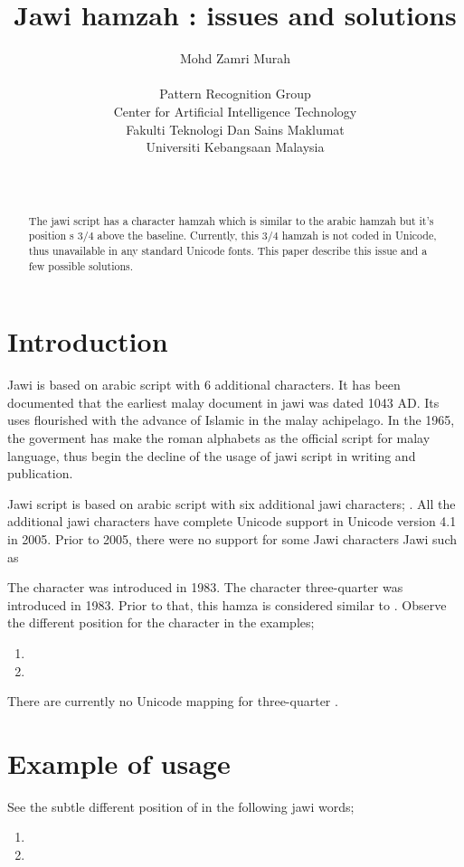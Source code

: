 \documentclass[12pt,a4paper]{IEEEconf}
\author{Mohd Zamri Murah\\
\begin{affiliation}Pattern Recognition Group\\
Center for Artificial Intelligence Technology\\
Fakulti Teknologi Dan Sains Maklumat\\
Universiti Kebangsaan Malaysia\\
\end{affiliation}\\
\email{zamri@ftsm.ukm.my}}
\title{Jawi hamzah : issues and solutions}
\begin{document}
\maketitle
\begin{abstract}
The jawi script has a character hamzah  which is  similar to the arabic hamzah but it's position s $3/4$ above the baseline. Currently, this $3/4$ hamzah is not coded in Unicode, thus unavailable in any standard Unicode fonts. This paper describe this issue and a few possible solutions.

\end{abstract}

\section{Introduction}

Jawi is based on arabic script with 6 additional characters. It has been documented that the earliest malay  document in jawi was dated 1043 AD. Its uses flourished with the advance of Islamic in the malay achipelago. In the 1965, the goverment has make the roman alphabets as the official script for malay language, thus begin the decline of the usage of jawi script in writing and publication.


Jawi script is based on arabic script with six additional jawi characters; . All the  additional jawi characters have complete Unicode support in Unicode version 4.1 in 2005.  Prior to 2005, there were no support for some Jawi characters Jawi such as 

The character  was introduced in 1983\cite{musa2006}. The character three-quarter \textarab{\raisebox{4pt}{ء}} was introduced in 1983. Prior to that, this hamza is considered similar to . Observe the different position for the character  in the examples;
\begin{enumerate}
\item {} 
\item {}
\end{enumerate}

There are currently no Unicode mapping for three-quarter \textarab{\raisebox{4pt}{ء}}.

\section{Example of usage}
See the subtle different position of   in the following jawi words;
\begin{enumerate}
\item {}
\item {}
\end{enumerate}
 
\end{document}
